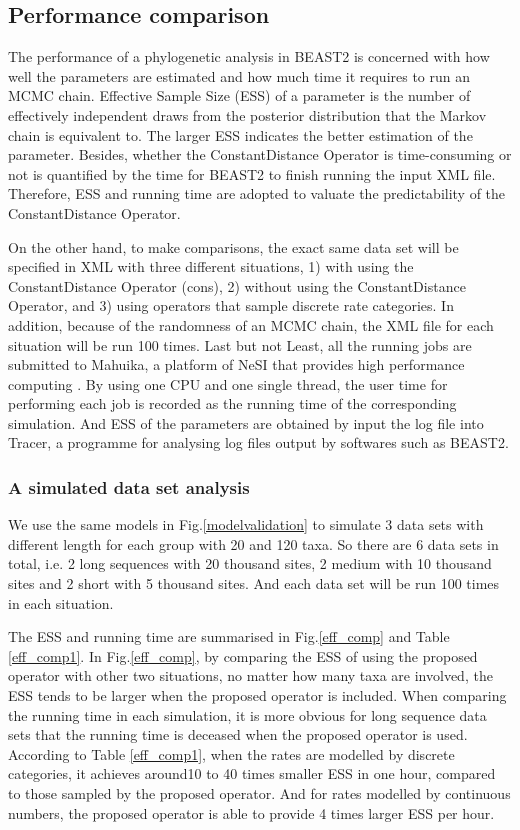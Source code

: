 \documentclass{bmcart}
\begin{document}
\subsection*{Performance comparison}
The performance of a phylogenetic analysis in BEAST2 is concerned with how well the parameters are estimated and how much time it requires to run an MCMC chain. Effective Sample Size (ESS) of a parameter is the number of effectively independent draws from the posterior distribution that the Markov chain is equivalent to. The larger ESS indicates the better estimation of the parameter.  Besides, whether the ConstantDistance Operator is time-consuming or not is quantified by the time for BEAST2 to finish running the input XML file. Therefore, ESS and running time are adopted to valuate the predictability of the ConstantDistance Operator. 

On the other hand, to make comparisons, the exact same data set will be specified in XML with three different situations, 1) with using the ConstantDistance Operator (cons), 2) without using the ConstantDistance Operator, and 3) using operators that sample discrete rate categories. In addition, because of the randomness of an MCMC chain, the XML file for each situation will be run 100 times. Last but not Least, all the running jobs are submitted to Mahuika, a platform of NeSI that provides high performance computing \cite{nesi}.  By using one CPU and one single thread, the user time for performing each job is recorded as the running time of the corresponding simulation. And ESS of the parameters are obtained by input the log file into Tracer, a programme for analysing log files output by softwares such as BEAST2.
\subsubsection*{A simulated data set analysis}
We use the same models in Fig.\ref{modelvalidation}  to simulate 3 data sets with different length for each group with 20 and 120 taxa. So there are 6 data sets in total, i.e. 2 long sequences with 20 thousand sites, 2 medium with 10 thousand sites and 2 short with 5 thousand sites. And each data set will be run 100 times in each situation. 

The ESS and running time are summarised in Fig.\ref{eff_comp} and Table \ref{eff_comp1}. In Fig.\ref{eff_comp}, by comparing the ESS of using the proposed operator with other two situations, no matter how many taxa are involved, the ESS tends to be larger when the proposed operator is included. When comparing the running time in each simulation, it is more obvious for long sequence data sets that the running time is deceased when the proposed operator is used. According to Table \ref{eff_comp1}, when the rates are modelled by discrete categories, it achieves around10 to 40 times smaller ESS in one hour, compared to those sampled by the proposed operator. And for rates modelled by continuous numbers, the proposed operator is able to provide 4 times larger ESS per hour. 
\end{document}
